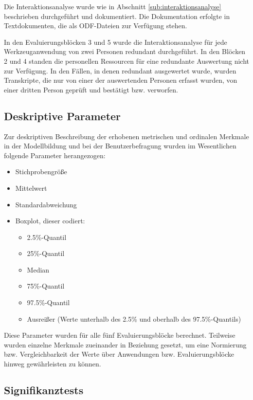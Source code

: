 Die Interaktionsanalyse wurde wie in Abschnitt \ref{sub:interaktionsanalyse} beschrieben durchgeführt und dokumentiert. Die Dokumentation erfolgte in Textdokumenten, die als \gls{ODF}-Dateien zur Verfügung stehen.

In den Evaluierungsblöcken 3 und 5 wurde die Interaktionsanalyse für jede Werkzeuganwendung von zwei Personen redundant durchgeführt. In den Blöcken 2 und 4 standen die personellen Ressourcen für eine redundante Auswertung nicht zur Verfügung. In den Fällen, in denen redundant ausgewertet wurde, wurden Transkripte, die nur von einer der auswertenden Personen erfasst wurden, von einer dritten Person geprüft und bestätigt bzw. verworfen.

\subsection{Deskriptive Parameter} %
\label{sub:deskriptive_parameter}

Zur deskriptiven Beschreibung der erhobenen metrischen und ordinalen Merkmale in der Modellbildung und bei der Benutzerbefragung wurden im Wesentlichen folgende Parameter herangezogen:

\begin{itemize}
	\item Stichprobengröße
	\item Mittelwert
	\item Standardabweichung
	\item Boxplot, dieser codiert:
		\begin{itemize}
			\item 2.5\%-Quantil
			\item 25\%-Quantil
			\item Median
			\item 75\%-Quantil
			\item 97.5\%-Quantil
			\item Ausreißer (Werte unterhalb des 2.5\% und oberhalb des 97.5\%-Quantils)
		\end{itemize}
\end{itemize}

Diese Parameter wurden für alle fünf Evaluierungsblöcke berechnet. Teilweise wurden einzelne Merkmale zueinander in Beziehung gesetzt, um eine Normierung bzw. Vergleichbarkeit der Werte über Anwendungen bzw. Evaluierungsblöcke hinweg gewährleisten zu können.

\subsection{Signifikanztests} %
\label{sub:signifikanztests_fb}

